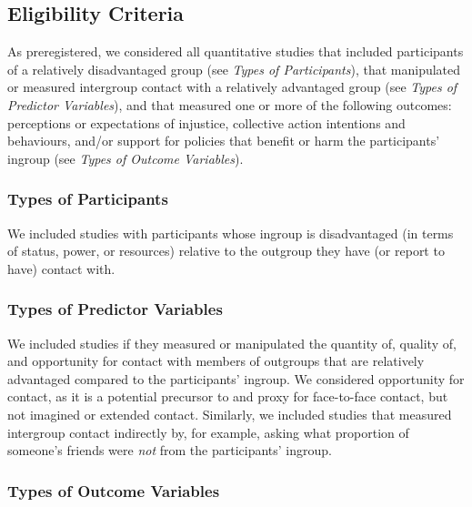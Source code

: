 \documentclass[12pt, letterpaper]{article}
\begin{document}
\hypertarget{eligibility-criteria}{%
\subsection{Eligibility Criteria}\label{eligibility-criteria}}

As preregistered, we considered all quantitative studies that included
participants of a relatively disadvantaged group (see \emph{Types of
Participants}), that manipulated or measured intergroup contact with a
relatively advantaged group (see \emph{Types of Predictor Variables}),
and that measured one or more of the following outcomes: perceptions or
expectations of injustice, collective action intentions and behaviours,
and/or support for policies that benefit or harm the participants'
ingroup (see \emph{Types of Outcome Variables}).

\hypertarget{types-of-participants}{%
\subsubsection{Types of Participants}\label{types-of-participants}}

We included studies with participants whose ingroup is disadvantaged (in
terms of status, power, or resources) relative to the outgroup they have
(or report to have) contact with.

\hypertarget{types-of-predictor-variables}{%
\subsubsection{Types of Predictor
Variables}\label{types-of-predictor-variables}}

We included studies if they measured or manipulated the quantity of,
quality of, and opportunity for contact with members of outgroups that
are relatively advantaged compared to the participants' ingroup. We
considered opportunity for contact, as it is a potential precursor to
and proxy for face-to-face contact, but not imagined or extended
contact. Similarly, we included studies that measured intergroup contact
indirectly by, for example, asking what proportion of someone's friends
were \emph{not} from the participants' ingroup.

\hypertarget{types-of-outcome-variables}{%
\subsubsection{Types of Outcome
Variables}\label{types-of-outcome-variables}}
\end{document}
